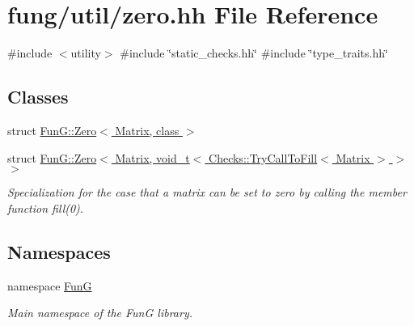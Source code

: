 \hypertarget{zero_8hh}{\section{fung/util/zero.hh \-File \-Reference}
\label{zero_8hh}
}
{\ttfamily \#include $<$utility$>$}\*
{\ttfamily \#include \char`\"{}static\-\_\-checks.\-hh\char`\"{}}\*
{\ttfamily \#include \char`\"{}type\-\_\-traits.\-hh\char`\"{}}\*
\subsection*{\-Classes}
\begin{DoxyCompactItemize}
\item 
struct \hyperlink{structFunG_1_1Zero}{\-Fun\-G\-::\-Zero$<$ Matrix, class $>$}
\item 
struct \hyperlink{structFunG_1_1Zero_3_01Matrix_00_01void__t_3_01Checks_1_1TryCallToFill_3_01Matrix_01_4_01_4_01_4}{\-Fun\-G\-::\-Zero$<$ Matrix, void\-\_\-t$<$ Checks\-::\-Try\-Call\-To\-Fill$<$ Matrix $>$ $>$ $>$}
\begin{DoxyCompactList}\small\item\em \-Specialization for the case that a matrix can be set to zero by calling the member function fill(0). \end{DoxyCompactList}\end{DoxyCompactItemize}
\subsection*{\-Namespaces}
\begin{DoxyCompactItemize}
\item 
namespace \hyperlink{namespaceFunG}{\-Fun\-G}
\begin{DoxyCompactList}\small\item\em \-Main namespace of the \-Fun\-G library. \end{DoxyCompactList}\end{DoxyCompactItemize}
